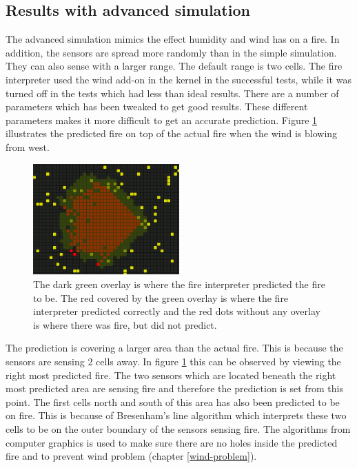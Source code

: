 \subsection{Results with advanced simulation}
The advanced simulation mimics the effect humidity and wind has on a fire. In addition, the sensors are spread more randomly than in the simple simulation. They can also sense with a larger range. The default range is two cells. The fire interpreter used the wind add-on in the kernel in the successful tests, while it was turned off in the tests which had less than ideal results. There are a number of parameters which has been tweaked to get good results. These different parameters makes it more difficult to get an accurate prediction. Figure \ref{fig:wind-advanced-bresenham-large} illustrates the predicted fire on top of the actual fire when the wind is blowing from west.

\begin{figure}[here]
  \centering
      \includegraphics[width=0.5\textwidth]{discussion/graphics/wind-advanced-bresenham-large.png}
  \caption{The dark green overlay is where the fire interpreter predicted the fire to be. The red covered by the green overlay is where the fire interpreter predicted correctly and the red dots without any overlay is where there was fire, but did not predict.}
  \label{fig:wind-advanced-bresenham-large}
\end{figure}

The prediction is covering a larger area than the actual fire. This is because the sensors are sensing 2 cells away. In figure \ref{fig:wind-advanced-bresenham-large} this can be observed by viewing the right most predicted fire. The two sensors which are located beneath the right most predicted area are sensing fire and therefore the prediction is set from this point. The first cells north and south of this area has also been predicted to be on fire. This is because of Bresenham’s line algorithm which interprets these two cells to be on the outer boundary of the sensors sensing fire. The algorithms from computer graphics is used to make sure there are no holes inside the predicted fire and to prevent wind problem (chapter \ref{wind-problem}).

